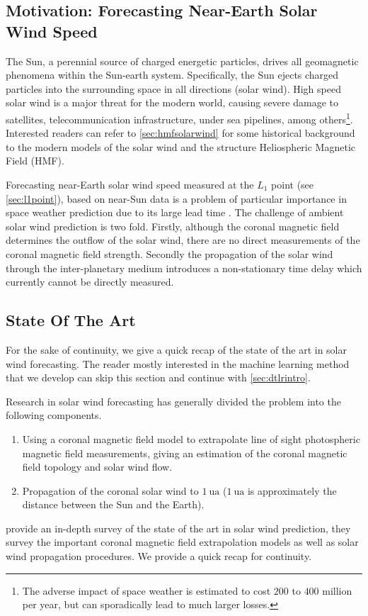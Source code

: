 \subsection{Motivation: Forecasting Near-Earth Solar Wind Speed}\label{sec:motivationsolarwind}
The Sun, a perennial source of charged energetic particles, drives all geomagnetic phenomena within 
the Sun-earth system. Specifically, the Sun ejects charged particles into the surrounding space in 
all directions (solar wind). High speed solar wind is a major threat for the modern world, causing 
severe damage to satellites, telecommunication infrastructure, under sea pipelines, among 
others\footnote{The adverse impact of space weather is estimated to cost $200$ to $400$ 
million per year, but can sporadically lead to much larger losses.}. Interested readers can refer 
to \cref{sec:hmfsolarwind} for some historical background to the modern models of the solar wind 
and the structure Heliospheric Magnetic Field (HMF). 

Forecasting near-Earth solar wind speed measured at the $L_1$ point (see \cref{sec:l1point}), 
based on near-Sun data is a problem of particular importance in space weather prediction due to its 
large lead time \citep{doi:10.1002/jgra.50429,doi:10.1029/2009SW000542}. The challenge of ambient 
solar wind prediction is two fold. Firstly, although the coronal magnetic field determines the 
outflow of the solar wind, there are no direct measurements of the coronal magnetic field strength. 
Secondly the propagation of the solar wind through the inter-planetary medium introduces a 
non-stationary time delay which currently cannot be directly measured. 

\subsection{State Of The Art}\label{sec:solarwindsota}
For the sake of continuity, we give a quick recap of the state of the art in solar wind 
forecasting. The reader mostly interested in the machine learning method that we develop can skip 
this section and continue with \cref{sec:dtlrintro}.  

Research in solar wind forecasting has generally divided the problem into the following components.
%
\begin{enumerate} 
  \item Using a coronal magnetic field model to extrapolate line of sight photospheric magnetic 
        field measurements, giving an estimation of the coronal magnetic field topology and 
        solar wind flow.
  \item Propagation of the coronal solar wind to $\SI{1}{\astronomicalunit}$ 
        ($\SI{1}{\astronomicalunit}$ is approximately the distance between the Sun and the Earth).
\end{enumerate} 
%
\citet{Reiss_2019} provide an in-depth survey of the state of the art in solar wind prediction, 
they survey the important coronal magnetic field extrapolation models as well as solar wind 
propagation procedures. We provide a quick recap for continuity.

